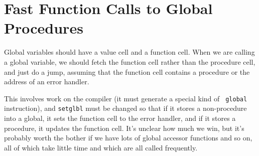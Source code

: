 \section{Fast Function Calls to Global Procedures}

Global variables should have a value cell and a function cell. When we are
calling a global variable, we should fetch the function cell rather than
the procedure cell, and just do a jump, assuming that the function cell
contains a procedure or the address of an error handler.

This involves work on the compiler (it must generate a special kind of {\tt
global} instruction), and {\tt setglbl} must be changed so that if it stores
a non-procedure into a global, it sets the function cell to the error
handler, and if it stores a procedure, it updates the function cell. It's
unclear how much we win, but it's probably worth the bother if we have lots
of global accessor functions and so on, all of which take little time and
which are all called frequently.

